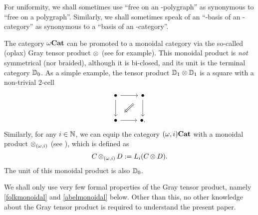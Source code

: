 \documentclass{amsart}
\begin{document}
\begin{remark}
  For uniformity, we shall sometimes use ``free on an
  \ook{\omega}\nbd-polygraph'' as synonymous to ``free on a
  polygraph''. Similarly, we shall sometimes speak of an ``\ook{\omega}\nbd-basis of
  an \ook{\omega}-category'' as synonymous to a ``basis of an \oo\nbd-category''.
\end{remark}
\begin{paragr}
  The category ${\omega}\mathbf{Cat}$ can be promoted to a monoidal category via the
  so-called (oplax) Gray tensor product $\operatorname{\otimes}_{}$ (see
  \cite[Appendix A]{aramaltsiniotis:joint} for example). This monoidal product is
  \emph{not} symmetrical (nor braided), although it is bi-closed, and its unit is the
  terminal category $\mathbb{D}_{0}$. As a simple example, the tensor product $\mathbb{D}_{1}\otimes\mathbb{D}_{1}$ is a square with a
  non-trivial $2$\nbd-cell
  \[
    \begin{tikzcd}[column sep=2pc, row sep=2pc]
      \bullet \ar[r] \ar[d] & \bullet \ar[d]\\
      \bullet \ar[r] & \bullet.
      \ar[to=2-1,from=1-2,Rightarrow,shorten=3mm]
    \end{tikzcd}
  \]
  Similarly, for any $i \in \mathbb N$, we can equip the category $(\omega,i)\mathbf{Cat}$
  with a monoidal product $\operatorname{\otimes}_{(\omega,i)}$ (see \cite[section 6]{aralucas:folmon}), which is defined as
  \[
    C \operatorname{\otimes}_{(\omega,i)}D:=L_i(C \operatorname{\otimes}_{} D).
  \]
  The unit of this monoidal product is also $\mathbb{D}_{0}$. 
\end{paragr}
\begin{remark}
   We shall only use very few formal properties of the Gray
  tensor product, namely \cref{folkmonoidal} and \cref{abelmonoidal} below. Other than this,
  no other knowledge about the Gray tensor product is required to
  understand the present paper.
\end{remark}
\end{document}
